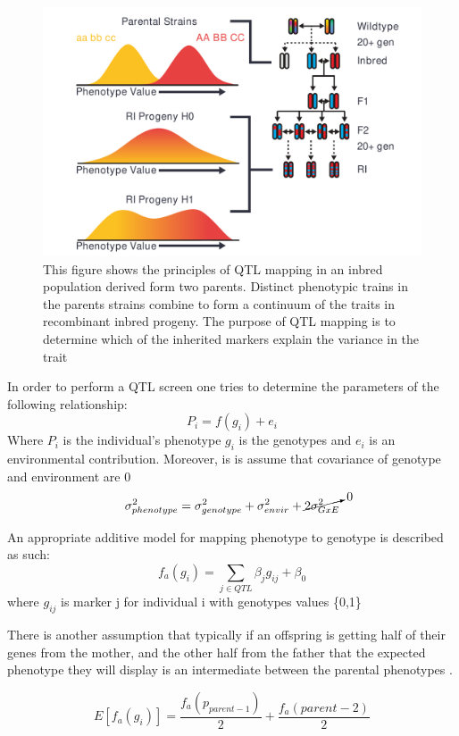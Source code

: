 \documentclass[a4paper]{book}
\begin{document}
	\begin{figure}[ht!]
		\includegraphics[width=\linewidth]{QTL_Results/QTL_Introduction.pdf}
		\caption{This figure shows the principles of QTL mapping in an inbred population derived form two parents. Distinct phenotypic trains in the parents strains combine to form a continuum of the traits in recombinant inbred progeny. The purpose of QTL mapping is to determine which of the inherited markers explain the variance in the trait}
		\label{fig:QTL Explanation}
	\end{figure}
	
	In order to perform a QTL screen one tries to determine the parameters of the following relationship:
	$$P_i = f(g_i) + e_i $$
	Where $P_i$ is the individual's phenotype
	$g_i$ is the genotypes and $e_i$ is an environmental contribution.
	Moreover, is is assume that covariance of genotype and environment are 0 \citep{Broman2009AR/qtl}
	$$ \sigma_{phenotype}^2 = \sigma_{genotype}^2 + \sigma_{envir}^2 + \cancelto{0}{2{\sigma_{G x E}^2}} $$
	
	An appropriate additive model for mapping phenotype to genotype is described as such:
	$$ f_a(g_i) = \sum_{j \in QTL }\beta_jg_{ij} + \beta_0 $$
	where $g_{ij}$ is marker j for individual i with genotypes values \{0,1\} 
	
	There is another assumption that typically if an offspring is getting half of their genes from the mother, and the other half from the father that the expected phenotype they will display is an intermediate between the parental phenotypes \citep{Broman2009AR/qtl}.
	
	$$ E[f_a(g_i)] = \dfrac{f_a(p_{parent-1})}{2} + \dfrac{f_a(parent-2)}{2}$$
	
\end{document}
